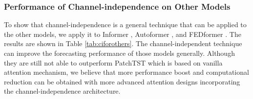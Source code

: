 \documentclass{article} \usepackage{iclr2023_conference,times}
\begin{document}
\subsubsection{Performance of Channel-independence on Other Models}
\label{sec::ciforothers}

To show that channel-independence is a general technique that can be applied to the other models, we apply it to Informer \citep{informer}, Autoformer \citep{autoformer}, and FEDformer \citep{fedformer}. The results are shown in Table \ref{tab:ciforothers}. The channel-independent technique can improve the forecasting performance of those models generally. Although they are still not able to outperform PatchTST which is based on vanilla attention mechanism, we believe that more performance boost and computational reduction can be obtained with more advanced attention designs incorporating the channel-independence architecture. 
\end{document}
